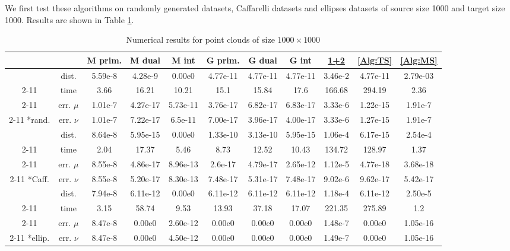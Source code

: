 \documentclass[english]{pkupaper}
\begin{document}
We first test these algorithms on randomly generated datasets, Caffarelli datasets and ellipses datasets of source size 1000 and target size 1000. Results are shown in Table \ref{Tbl:PC1000}.

\begin{table}[htbp]
\centering \footnotesize
\begin{tabular}{|c|c|c|c|c|c|c|c|c|c|c|}
\hline
& & M prim. & M dual & M int & G prim. & G dual & G int & \hyperlink{EAlg:12}{1+2} & \ref{Alg:TS} & \ref{Alg:MS} \\ \hline
& dist. & 5.59e-8 & 4.28e-9 & 0.00e0 & 4.77e-11 & 4.77e-11 & 4.77e-11 & 3.46e-2 & 4.77e-11 & 2.79e-03 \\ \cline{2-11}
& time & 3.66 & 16.21 & 10.21 & 15.1 & 15.84 & 17.6 & 166.68 & 294.19 & 2.36 \\ \cline{2-11}
& err. $\mu$ & 1.01e-7 & 4.27e-17 & 5.73e-11 & 3.76e-17 & 6.82e-17 & 6.83e-17 & 3.33e-6 & 1.22e-15 & 1.91e-7 \\ \cline{2-11}
\multirow{-4}*{rand.} & err. $\nu$ & 1.01e-7 & 7.22e-17 & 6.5e-11 & 7.00e-17 & 3.96e-17 & 4.00e-17 & 3.33e-6 & 1.27e-15 & 1.91e-7 \\ \hline
& dist. & 8.64e-8 & 5.95e-15 & 0.00e0 & 1.33e-10 & 3.13e-10 & 5.95e-15 & 1.06e-4 & 6.17e-15 & 2.54e-4 \\ \cline{2-11}
& time & 2.04 & 17.37 & 5.46 & 8.73 & 12.52 & 10.43 & 134.72 & 128.97 & 1.37 \\ \cline{2-11}
& err. $\mu$ & 8.55e-8 & 4.86e-17 & 8.96e-13 & 2.6e-17 & 4.79e-17 & 2.65e-12 & 1.12e-5 & 4.77e-18 & 3.68e-18 \\ \cline{2-11}
\multirow{-4}*{Caff.} & err. $\nu$ & 8.55e-8 & 5.20e-17 & 8.30e-13 & 7.48e-17 & 5.31e-17 & 7.48e-17 & 9.02e-6 & 9.62e-17 & 5.42e-17 \\ \hline
& dist. & 7.94e-8 & 6.11e-12 & 0.00e0 & 6.11e-12 & 6.11e-12 & 6.11e-12 & 1.18e-4 & 6.11e-12 & 2.50e-5 \\ \cline{2-11}
& time & 3.15 & 58.74 & 9.53 & 13.93 & 37.18 & 17.07 & 221.35 & 275.89 & 1.2 \\ \cline{2-11}
& err. $\mu$ & 8.47e-8 & 0.00e0 & 2.60e-12 & 0.00e0 & 0.00e0 & 0.00e0 & 1.48e-7 & 0.00e0 & 1.05e-16 \\ \cline{2-11}
\multirow{-4}*{ellip.}& err. $\nu$ & 8.47e-8 & 0.00e0 & 4.50e-12 & 0.00e0 & 0.00e0 & 0.00e0 & 1.49e-7 & 0.00e0 & 1.05e-16 \\ \hline
\end{tabular}
\caption{Numerical results for point clouds of size $ 1000 \times 1000 $} \label{Tbl:PC1000}
\end{table}
\end{document}
